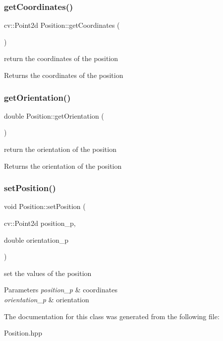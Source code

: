 \subsubsection{\texorpdfstring{get\+Coordinates()}{getCoordinates()}}
{\footnotesize\ttfamily cv\+::\+Point2d Position\+::get\+Coordinates (\begin{DoxyParamCaption}{ }\end{DoxyParamCaption})}



return the coordinates of the position 

\begin{DoxyReturn}{Returns}
the coordinates of the position 
\end{DoxyReturn}
\mbox{\label{class_position_af0b1158a379d54dd7ee08164eafe262e}} 
\subsubsection{\texorpdfstring{get\+Orientation()}{getOrientation()}}
{\footnotesize\ttfamily double Position\+::get\+Orientation (\begin{DoxyParamCaption}{ }\end{DoxyParamCaption})}



return the orientation of the position 

\begin{DoxyReturn}{Returns}
the orientation of the position 
\end{DoxyReturn}
\mbox{\label{class_position_acf00d240f456cc9b2c2910e803f53605}} 
\subsubsection{\texorpdfstring{set\+Position()}{setPosition()}}
{\footnotesize\ttfamily void Position\+::set\+Position (\begin{DoxyParamCaption}\item[{cv\+::\+Point2d}]{position\+\_\+p,  }\item[{double}]{orientation\+\_\+p }\end{DoxyParamCaption})}



set the values of the position 


\begin{DoxyParams}{Parameters}
{\em position\+\_\+p} & coordinates \\
\hline
{\em orientation\+\_\+p} & orientation \\
\hline
\end{DoxyParams}


The documentation for this class was generated from the following file\+:\begin{DoxyCompactItemize}
\item 
Position.\+hpp\end{DoxyCompactItemize}
